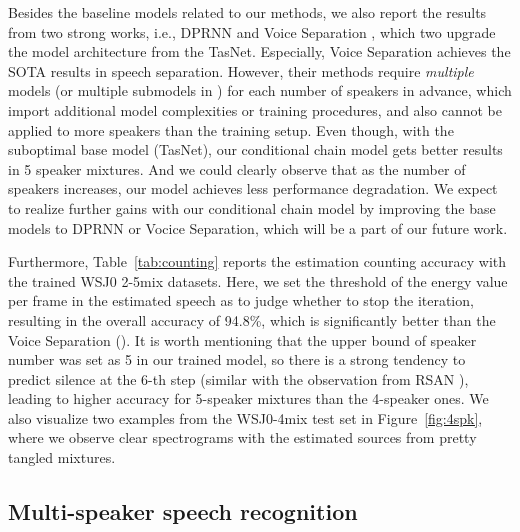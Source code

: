 \documentclass{article}
\begin{document}
Besides the baseline models related to our methods, we also report the results from two strong works, i.e., DPRNN\cite{luo2019dual} and Voice Separation \cite{nachmani2020voice}, which two upgrade the model architecture from the TasNet. 
Especially, Voice Separation \cite{nachmani2020voice} achieves the SOTA results in speech separation.
However, their methods require \textit{multiple} models (or multiple submodels in \cite{nachmani2020voice}) for each number of speakers in advance, which import additional model complexities or training procedures, and also cannot be applied to more speakers than the training setup.
Even though, with the suboptimal base model (TasNet), our conditional chain model gets better results in 5 speaker mixtures. 
And we could clearly observe that as the number of speakers increases, our model achieves less performance degradation. We expect to realize further gains with our conditional chain model by improving the base models to DPRNN or Vocice Separation, which will be a part of our future work.  

Furthermore, Table~\ref{tab:counting} reports the estimation counting accuracy with the trained WSJ0 2-5mix datasets. Here, we set the threshold of the energy value per frame in the estimated speech as  to judge whether to stop the iteration, resulting in the overall accuracy of 94.8\%, which is significantly better than the Voice Separation \cite{nachmani2020voice} (). 
It is worth mentioning that the upper bound of speaker number was set as 5 in our trained model, so there is a strong tendency to predict silence at the 6-th step (similar with the observation from RSAN \cite{kinoshita2018listening}),  leading to higher accuracy for 5-speaker mixtures than the 4-speaker ones. We also visualize two examples from the WSJ0-4mix test set in Figure~\ref{fig:4spk}, where we observe clear spectrograms with the estimated sources from pretty tangled mixtures.

\subsection{Multi-speaker speech recognition}
\label{ssec:ms_asr}
\end{document}
